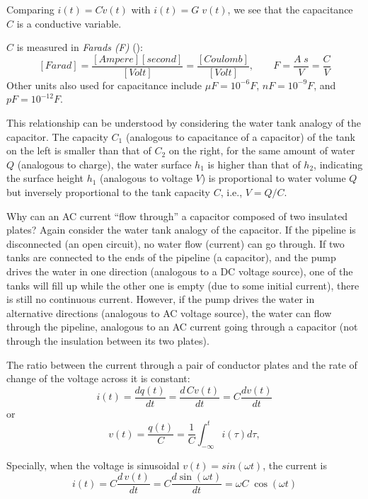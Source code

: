 \begin{itemize}
\begin{itemize}
  Comparing $i(t)=C\dot{v}(t)$ with $i(t)=G\;v(t)$, we see that the 
  capacitance $C$ is a conductive variable.

  $C$ is measured in {\em Farads (F)} 
  ():
  \[ 
    [Farad]=\frac{[Ampere][second]}{[Volt]} =\frac{[Coulomb]}{[Volt]},
    \;\;\;\;\;\;\;
    F=\frac{A\;s}{V}=\frac{C}{V}
  \]
  Other units also used for capacitance include $\mu F=10^{-6} F$, 
  $nF=10^{-9}F$, and $pF=10^{-12}F$.

   
  
  This relationship can be understood by considering the water tank
  analogy of the capacitor. The capacity $C_1$ (analogous to capacitance
  of a capacitor) of the tank on the left is smaller than that of $C_2$
  on the right, for the same amount of water $Q$ (analogous to charge), 
  the water surface $h_1$ is higher than that of $h_2$, indicating the 
  surface height $h_1$ (analogous to voltage $V$) is proportional to 
  water volume $Q$ but inversely proportional to the tank capacity $C$,
  i.e., $V=Q/C$.
   
   
  Why can an AC current ``flow through'' a capacitor composed of two 
  insulated plates? Again consider the water tank analogy of the 
  capacitor. If the pipeline is disconnected (an open circuit), no 
  water flow (current) can go through. If two tanks are connected to 
  the ends of the pipeline (a capacitor), and the pump drives the 
  water in one direction (analogous to a DC voltage source), one of 
  the tanks will fill up while the other one is empty (due to some
  initial current), there is still no continuous current. However, 
  if the pump drives the water in alternative directions (analogous 
  to AC voltage source), the water can flow through the pipeline, 
  analogous to an AC current going through a capacitor (not through 
  the insulation between its two plates).

  The ratio between the current through a pair of conductor plates 
  and the rate of change of the voltage across it is constant:
  \[ 
  i(t)=\frac{dq(t)}{dt}=\frac{d\,Cv(t)}{dt}=C\frac{dv(t)}{dt}
  \]
  or
  \[
  v(t)=\frac{q(t)}{C}=\frac{1}{C}\int_{-\infty}^t i(\tau) d\tau,
  \]

  Specially, when the voltage is sinusoidal $v(t)=sin(\omega t)$, the 
  current is
  \[
  i(t)=C \frac{d\,v(t)}{dt}=C \frac{d\sin(\omega t)}{dt}
  =\omega C\;\cos(\omega t)
  \]
  

\end{itemize}
\end{itemize}
